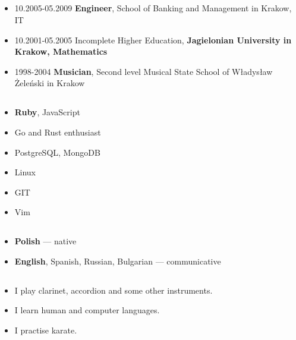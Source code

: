 \documentclass[a4paper]{article}
\begin{document}
\subsection*{}
\begin{itemize}
  \item
    10.2005-05.2009 \textbf{Engineer}, School of Banking and Management in Krakow, IT

  \item
    10.2001-05.2005 Incomplete Higher Education,
    \textbf{Jagielonian University in Krakow, Mathematics}

  \item
    1998-2004 \textbf{Musician},
    Second level Musical State School of Władysław Żeleński in Krakow
\end{itemize}

\subsection*{}
\begin{itemize}
\item
  \textbf{Ruby}, JavaScript
\item
  Go and Rust enthusiast
\item
  PostgreSQL, MongoDB
\item
  Linux
\item
  GIT
\item
  Vim
\end{itemize}

\subsection*{}
\begin{itemize}
\item
  \textbf{Polish} --- native
\item
  \textbf{English}, Spanish, Russian, Bulgarian --- communicative
\end{itemize}

\subsection*{}
\begin{itemize}
\item
	I play clarinet, accordion and some other instruments.
\item
  I learn human and computer languages.
\item
  I practise karate.
\end{itemize}
\end{document}
